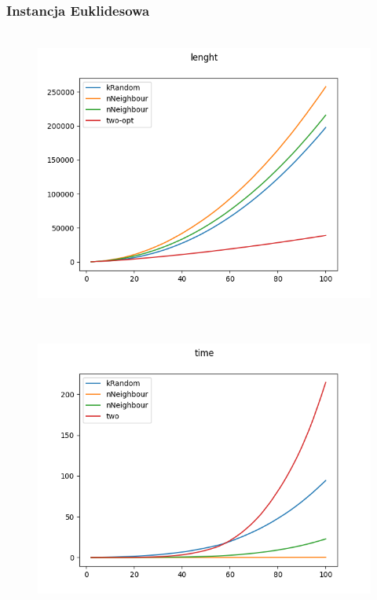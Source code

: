 \documentclass[11pt]{article}
\begin{document}
\subsubsection{Instancja Euklidesowa }
            \begin{center}
            \begin{figure}[H]

                \\ \includegraphics[scale=0.7]{images/lenght_sym.png}\

            \end{figure}
            \end{center}
            \begin{center}
            \begin{figure}[H]

                \\ \includegraphics[scale=0.7]{images/time_sym.png}\

            \end{figure}
            \end{center}
\end{document}

